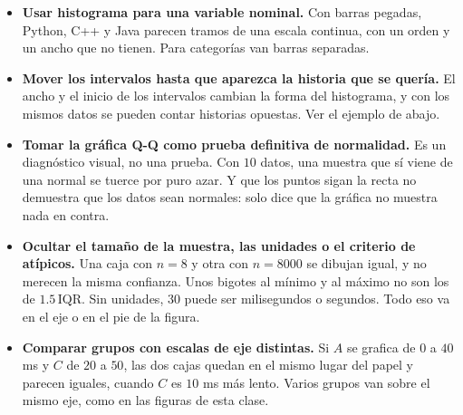 \documentclass[11pt,letterpaper]{article}
\begin{document}
\begin{itemize}[itemsep=0.5em]
    \item \textbf{Usar histograma para una variable nominal.} Con
          barras pegadas, Python, C++ y Java parecen tramos de una
          escala continua, con un orden y un ancho que no tienen. Para
          categorías van barras separadas.
    \item \textbf{Mover los intervalos hasta que aparezca la historia
          que se quería.} El ancho y el inicio de los intervalos
          cambian la forma del histograma, y con los mismos datos se
          pueden contar historias opuestas. Ver el ejemplo de abajo.
    \item \textbf{Tomar la gráfica Q-Q como prueba definitiva de
          normalidad.} Es un diagnóstico visual, no una prueba. Con
          $10$ datos, una muestra que sí viene de una normal se tuerce
          por puro azar. Y que los puntos sigan la recta no demuestra
          que los datos sean normales: solo dice que la gráfica no
          muestra nada en contra.
    \item \textbf{Ocultar el tamaño de la muestra, las unidades o el
          criterio de atípicos.} Una caja con $n = 8$ y otra con
          $n = 8000$ se dibujan igual, y no merecen la misma
          confianza. Unos bigotes al mínimo y al máximo no son los de
          $1.5\,\text{IQR}$. Sin unidades, $30$ puede ser milisegundos
          o segundos. Todo eso va en el eje o en el pie de la figura.
    \item \textbf{Comparar grupos con escalas de eje distintas.} Si $A$
          se grafica de $0$ a $40$ ms y $C$ de $20$ a $50$, las dos
          cajas quedan en el mismo lugar del papel y parecen iguales,
          cuando $C$ es $10$ ms más lento. Varios grupos van sobre el
          mismo eje, como en las figuras de esta clase.
\end{itemize}
\end{document}
